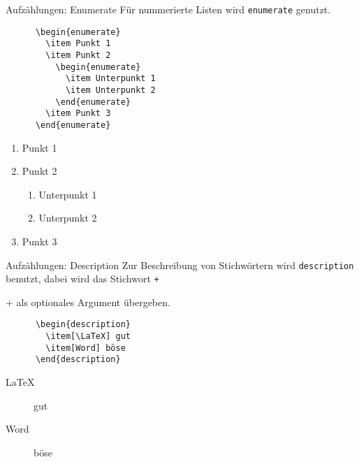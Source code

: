 \begin{frame}[fragile]{Aufzählungen: Enumerate}
  Für nummerierte Listen wird \texttt{enumerate} genutzt.
  \begin{CodeExample}{0.48}
    \begin{verbatim}
      \begin{enumerate}
        \item Punkt 1
        \item Punkt 2
          \begin{enumerate}
            \item Unterpunkt 1
            \item Unterpunkt 2
          \end{enumerate}
        \item Punkt 3
      \end{enumerate}
    \end{verbatim}
  \CodeResult
    \begin{minipage}[c][9\baselineskip][c]{\textwidth}
      \begin{enumerate}
        \item Punkt 1
        \item Punkt 2
          \begin{enumerate}
            \item Unterpunkt 1
            \item Unterpunkt 2
          \end{enumerate}
        \item Punkt 3
      \end{enumerate}
    \end{minipage}
  \end{CodeExample}
\end{frame}

\begin{frame}[fragile]{Aufzählungen: Description}
  Zur Beschreibung von Stichwörtern wird \texttt{description} benutzt, dabei wird das
Stichwort \texttt+\item+ als optionales Argument übergeben.
  \begin{CodeExample}{0.48}
    \begin{verbatim}
      \begin{description}
        \item[\LaTeX] gut
        \item[Word] böse
      \end{description}
    \end{verbatim}
  \CodeResult
    \begin{minipage}[c][4\baselineskip][c]{\textwidth}
      \begin{description}
        \item[\LaTeX] gut
        \item[Word] böse
      \end{description}
    \end{minipage}
  \end{CodeExample}
\end{frame}
